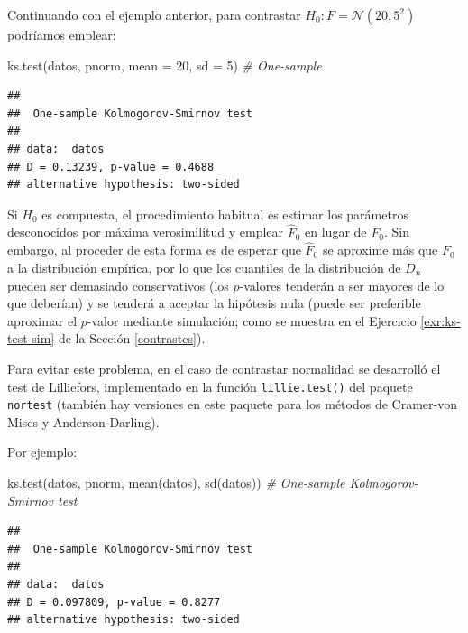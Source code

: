 \documentclass[
]{book}
\newenvironment{Shaded}{\begin{snugshade}}{\end{snugshade}}
\newcommand{\AttributeTok}[1]{\textcolor[rgb]{0.77,0.63,0.00}{#1}}
\newcommand{\CommentTok}[1]{\textcolor[rgb]{0.56,0.35,0.01}{\textit{#1}}}
\newcommand{\DecValTok}[1]{\textcolor[rgb]{0.00,0.00,0.81}{#1}}
\newcommand{\FunctionTok}[1]{\textcolor[rgb]{0.00,0.00,0.00}{#1}}
\newcommand{\NormalTok}[1]{#1}
\theoremstyle{break}
\theoremstyle{definition}
\theoremstyle{definition}
\theoremstyle{definition}
\theoremstyle{definition}
\theoremstyle{remark}
\begin{document}
Continuando con el ejemplo anterior, para contrastar \(H_0:F= \mathcal{N}(20,5^2)\) podríamos emplear:

\begin{Shaded}
\begin{Highlighting}[]
\FunctionTok{ks.test}\NormalTok{(datos, pnorm, }\AttributeTok{mean =} \DecValTok{20}\NormalTok{, }\AttributeTok{sd =} \DecValTok{5}\NormalTok{) }\CommentTok{\# One{-}sample }
\end{Highlighting}
\end{Shaded}

\begin{verbatim}
## 
##  One-sample Kolmogorov-Smirnov test
## 
## data:  datos
## D = 0.13239, p-value = 0.4688
## alternative hypothesis: two-sided
\end{verbatim}

Si \(H_0\) es compuesta, el procedimiento habitual es estimar los parámetros desconocidos
por máxima verosimilitud y emplear \(\hat{F}_0\) en lugar de \(F_0\).
Sin embargo, al proceder de esta forma es de esperar que \(\hat{F}_0\) se aproxime más
que \(F_0\) a la distribución empírica, por lo que los cuantiles de la distribución de
\(D_n\) pueden ser demasiado conservativos (los \(p\)-valores tenderán a ser mayores de
lo que deberían) y se tenderá a aceptar la hipótesis nula (puede ser preferible aproximar el \(p\)-valor mediante simulación; como se muestra en el Ejercicio \ref{exr:ks-test-sim} de la Sección \ref{contrastes}).

Para evitar este problema, en el caso de contrastar normalidad se desarrolló el test
de Lilliefors, implementado en la función \texttt{lillie.test()} del paquete \texttt{nortest}
(también hay versiones en este paquete para los métodos de Cramer-von Mises y
Anderson-Darling).

Por ejemplo:

\begin{Shaded}
\begin{Highlighting}[]
\FunctionTok{ks.test}\NormalTok{(datos, pnorm, }\FunctionTok{mean}\NormalTok{(datos), }\FunctionTok{sd}\NormalTok{(datos)) }\CommentTok{\# One{-}sample Kolmogorov{-}Smirnov test}
\end{Highlighting}
\end{Shaded}

\begin{verbatim}
## 
##  One-sample Kolmogorov-Smirnov test
## 
## data:  datos
## D = 0.097809, p-value = 0.8277
## alternative hypothesis: two-sided
\end{verbatim}
\end{document}
